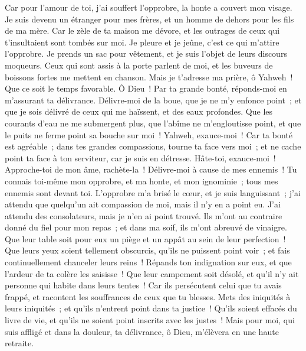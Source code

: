 \begin{multicols}{2}
Car pour l'amour de toi, j'ai souffert l'opprobre, la honte a couvert mon visage.
Je suis devenu un étranger pour mes frères, et un homme de dehors pour les fils de ma mère.
Car le zèle de ta maison me dévore, et les outrages de ceux qui t'insultaient sont tombés sur moi.
Je pleure et je jeûne, c'est ce qui m'attire l'opprobre.
Je prends un sac pour vêtement, et je suis l'objet de leurs discours moqueurs.
Ceux qui sont assis à la porte parlent de moi, et les buveurs de boissons fortes me mettent en chanson.
Mais je t'adresse ma prière, ô Yahweh~! Que ce soit le temps favorable. Ô Dieu~! Par ta grande bonté, réponds-moi en m'assurant ta délivrance.
Délivre-moi de la boue, que je ne m'y enfonce point~; et que je sois délivré de ceux qui me haïssent, et des eaux profondes.
Que les courants d'eau ne me submergent plus, que l'abîme ne m'engloutisse point, et que le puits ne ferme point sa bouche sur moi~!
Yahweh, exauce-moi~! Car ta bonté est agréable~; dans tes grandes compassions, tourne ta face vers moi~;
et ne cache point ta face à ton serviteur, car je suis en détresse. Hâte-toi, exauce-moi~!
Approche-toi de mon âme, rachète-la~! Délivre-moi à cause de mes ennemis~!
Tu connais toi-même mon opprobre, et ma honte, et mon ignominie~; tous mes ennemis sont devant toi.
L'opprobre m'a brisé le cœur, et je suis languissant~; j'ai attendu que quelqu'un ait compassion de moi, mais il n'y en a point eu. J'ai attendu des consolateurs, mais je n'en ai point trouvé.
Ils m'ont au contraire donné du fiel pour mon repas~; et dans ma soif, ils m'ont abreuvé de vinaigre.
Que leur table soit pour eux un piège et un appât au sein de leur perfection~!
Que leurs yeux soient tellement obscurcis, qu'ils ne puissent point voir~; et fais continuellement chanceler leurs reins~!
Répands ton indignation sur eux, et que l'ardeur de ta colère les saisisse~!
Que leur campement soit désolé, et qu'il n'y ait personne qui habite dans leurs tentes~!
Car ils persécutent celui que tu avais frappé, et racontent les souffrances de ceux que tu blesses.
Mets des iniquités à leurs iniquités~; et qu'ils n'entrent point dans ta justice~!
Qu'ils soient effacés du livre de vie, et qu'ils ne soient point inscrits avec les justes~!
Mais pour moi, qui suis affligé et dans la douleur, ta délivrance, ô Dieu, m'élèvera en une haute retraite.

\end{multicols}
